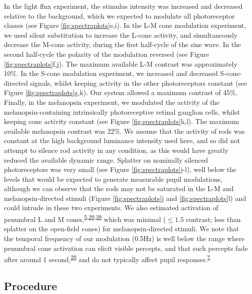 \documentclass[
]{article}
\begin{document}
In the light flux experiment, the stimulus intensity was increased and decreased relative to the background, which we expected to modulate all photoreceptor classes (see Figure \ref{fig:spectraplots}e,i). In the L-M cone modulation experiment, we used silent substitution to increase the L-cone activity, and simultaneously decrease the M-cone activity, during the first half-cycle of the sine wave. In the second half-cycle the polarity of the modulation reversed (see Figure \ref{fig:spectraplots}f,j). The maximum available L-M contrast was approximately 10\%. In the S-cone modulation experiment, we increased and decreased S-cone-directed signals, whilst keeping activity in the other photoreceptors constant (see Figure \ref{fig:spectraplots}g,k). Our system allowed a maximum contrast of 45\%. Finally, in the melanopsin experiment, we modulated the activity of the melanopsin-containing intrinsically photoreceptive retinal ganglion cells, whilst keeping cone activity constant (see Figure \ref{fig:spectraplots}h,l). The maximum available melanopsin contrast was 22\%. We assume that the activity of rods was constant at the high background luminance intensity used here, and so did not attempt to silence rod activity in any condition, as this would have greatly reduced the available dynamic range. Splatter on nominally silenced photoreceptors was very small (see Figure \ref{fig:spectraplots}j-l), well below the levels that would be expected to generate measurable pupil modulations, although we can observe that the rods may not be saturated in the L-M and melanopsin-directed stimuli (Figure \ref{fig:spectraplots}j and \ref{fig:spectraplots}l) and could intrude in these two experiments. We also estimated activation of penumbral L and M cones,\textsuperscript{\protect\hyperlink{ref-Barrionuevo2016}{5},\protect\hyperlink{ref-Spitschan2015}{29},\protect\hyperlink{ref-Zele2019}{39}} which was minimal (\(\le 1.5%
\) contrast; less than splatter on the open-field cones) for melanopsin-directed stimuli. We note that the temporal frequency of our modulation (0.5Hz) is well below the range where penumbral cone activation can elicit visible percepts, and that such percepts fade after around 1 second,\textsuperscript{\protect\hyperlink{ref-Spitschan2015}{29}} and do not typically affect pupil responses.\textsuperscript{\protect\hyperlink{ref-Spitschan2014}{7}}

\hypertarget{procedure}{%
\subsection{Procedure}\label{procedure}}
\end{document}
